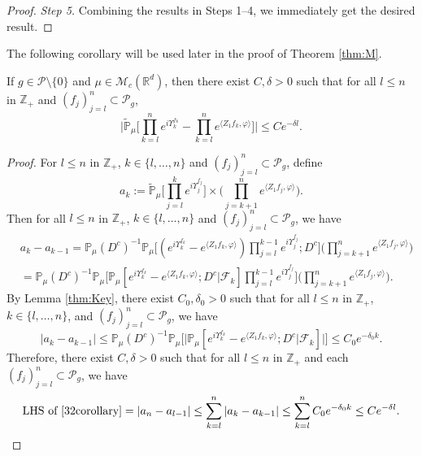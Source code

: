 \documentclass[EJP]{ejpecp} %
\begin{document}
\begin{proof}
 	\emph{Step 5.} Combining the results in Steps 1--4, we immediately get the desired result.
\end{proof}

	The following corollary  will be used later in the proof of Theorem \ref{thm:M}.
\begin{corollary}
\label{cor:MI}
	If  $g\in \mathcal{P}\setminus\{0\}$ and $\mu\in \mathcal M_c(\mathbb R^d)$, then there exist $C,\delta>0$ such that for all $l\leq n$ in $\mathbb Z_+$ and  $(f_j)_{j=l}^n\subset \mathcal P_g$,
\begin{equation}
  	\label{32corollary}
  	\Big|\mathbb{\widetilde{P}}_{\mu}\Big[\prod_{k=l}^ne^{i \Upsilon^{f_k}_{k} }-\prod_{k=l}^n e^{\langle Z_1f_k, \varphi\rangle}\Big]\Big|\leq C e^{-\delta l}.
\end{equation}
\end{corollary}
\begin{proof}
	For  $l\leq n$ in $\mathbb Z_+$, $k \in \{l,\dots,n\}$ and $(f_j)_{j=l}^n\subset \mathcal P_g$, define
\[
    a_k
    :=  \mathbb{\widetilde{P}}_{\mu}\Big[\prod_{j=l}^{k} e^{i\Upsilon_j^{f_j}}\Big] \times \Big(\prod_{j=k+1}^{n} e^{ \langle Z_1f_j,\varphi \rangle} \Big).
\]
	Then for all $l\leq n$ in $\mathbb Z_+$, $k \in \{l,\dots,n\}$ and $(f_j)_{j=l}^n\subset \mathcal P_g$, we have
\begin{align}
  	& a_{k} - a_{k-1}
   	=\mathbb{P}_{\mu}(D^c)^{-1} \mathbb{P}_{\mu}\Big[(e^{i\Upsilon^{f_k}_k}-e^{\langle Z_1f_k, \varphi\rangle})\prod_{j=l}^{k-1} e^{i\Upsilon_j^{f_j}};D^c\Big] \Big(\prod_{j=k+1}^n e^{\langle Z_1f_j, \varphi\rangle}\Big)\\
    & =\mathbb{P}_{\mu}(D^c)^{-1} \mathbb{P}_{\mu}\Big[\mathbb P_\mu[e^{i\Upsilon_k^{f_k}}-e^{\langle Z_1f_k, \varphi \rangle}; D^c|\mathscr F_k] \prod_{j=l}^{k-1} e^{i\Upsilon_j^{f_j}}\Big] \Big(\prod_{j=k+1}^{n}e^{\langle Z_1f_j, \varphi\rangle}\Big).
\end{align}
	By Lemma \ref{thm:Key}, there exist $C_0,\delta_0 >0$ such that for all $l\leq n$ in $\mathbb Z_+$,  $k \in \{l,\dots , n\}$, and $(f_j)_{j=l}^n\subset \mathcal P_g$, we have
\[
	| a_{k} - a_{k-1}|
	\leq \mathbb{P}_{\mu}(D^c)^{-1}\mathbb{P}_{\mu}\Big[\big|\mathbb P_\mu[e^{i\Upsilon_k^{f_k}}-e^{\langle Z_1f_k, \varphi \rangle}; D^c | \mathscr{F}_k]\big|\Big]
    \leq C_0 e^{-\delta_0 k}.
\]
	Therefore, there exist $C,\delta >0$ such that for all $l\leq n$ in $\mathbb Z_+$ and each $(f_j)_{j=l}^n\subset \mathcal P_g$, we have
\[
    \text{LHS of \eqref{32corollary}}
	= \left|a_n-a_{l-1}\right|
   	\leq \sum_{k=l}^n\left|a_{k}-a_{k-1}\right|
    \leq \sum_{k=l}^n C_0 e^{-\delta_0 k}
    \leq C e^{- \delta l}.
    \qedhere
\]
\end{proof}
\end{document}

